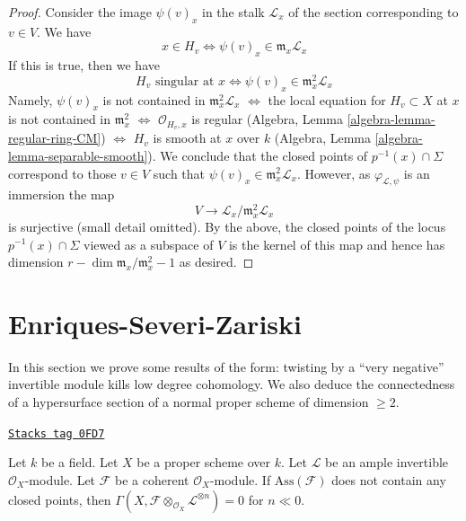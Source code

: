 \begin{proof}
\medskip\noindent
Consider the image $\psi(v)_x$ in the stalk $\mathcal{L}_x$
of the section corresponding to $v \in V$. We have
$$
x \in H_v \Leftrightarrow \psi(v)_x \in \mathfrak m_x\mathcal{L}_x
$$
If this is true, then we have
$$
H_v\text{ singular at }x \Leftrightarrow
\psi(v)_x \in \mathfrak m_x^2\mathcal{L}_x
$$
Namely, $\psi(v)_x$ is not contained in $\mathfrak m_x^2\mathcal{L}_x$
$\Leftrightarrow$
the local equation for $H_v \subset X$ at $x$ is not contained
in $\mathfrak m_x^2$
$\Leftrightarrow$
$\mathcal{O}_{H_v, x}$ is regular
(Algebra, Lemma \ref{algebra-lemma-regular-ring-CM})
$\Leftrightarrow$
$H_v$ is smooth at $x$ over $k$
(Algebra, Lemma \ref{algebra-lemma-separable-smooth}).
We conclude that the closed points of $p^{-1}(x) \cap \Sigma$ correspond
to those $v \in V$ such that $\psi(v)_x \in \mathfrak m_x^2\mathcal{L}_x$.
However, as $\varphi_{\mathcal{L}, \psi}$ is an immersion the
map
$$
V \longrightarrow \mathcal{L}_x/\mathfrak m_x^2\mathcal{L}_x
$$
is surjective (small detail omitted). By the above, the closed points
of the locus $p^{-1}(x) \cap \Sigma$ viewed as a subspace of $V$
is the kernel of this map and hence has dimension
$r - \dim \mathfrak m_x/\mathfrak m_x^2 - 1$ as desired.
\end{proof}

\section{Enriques-Severi-Zariski}
\label{varieties-section-vanishing-negative}
In this section we prove some results of the form: twisting by
a ``very negative'' invertible module kills low
degree cohomology. We also deduce the connectedness
of a hypersurface section of a normal proper scheme of
dimension $\geq 2$.

\begin{lemma}
\label{varieties-lemma-vanishin-h0-negative}
\href{https://stacks.math.columbia.edu/tag/0FD7}{\texttt{Stacks tag 0FD7}}

Let $k$ be a field. Let $X$ be a proper scheme over $k$. Let $\mathcal{L}$
be an ample invertible $\mathcal{O}_X$-module. Let $\mathcal{F}$ be a
coherent $\mathcal{O}_X$-module. If $\text{Ass}(\mathcal{F})$ does not
contain any closed points, then
$\Gamma(X, \mathcal{F} \otimes_{\mathcal{O}_X} \mathcal{L}^{\otimes n}) = 0$
for $n \ll 0$.
\end{lemma}


